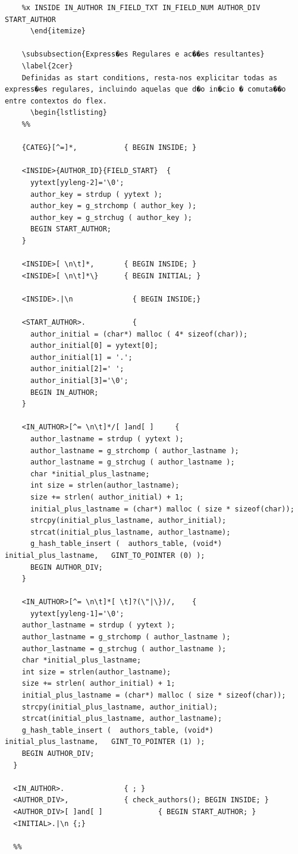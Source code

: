 \documentclass{report}
\begin{document}
      \begin{lstlisting}
    %x INSIDE IN_AUTHOR IN_FIELD_TXT IN_FIELD_NUM AUTHOR_DIV START_AUTHOR
      \end{itemize}

    \subsubsection{Express�es Regulares e ac��es resultantes}
    \label{2cer}
    Definidas as start conditions, resta-nos explicitar todas as express�es regulares, incluindo aquelas que d�o in�cio � comuta��o entre contextos do flex.
      \begin{lstlisting}
    %%

    {CATEG}[^=]*,           { BEGIN INSIDE; }

    <INSIDE>{AUTHOR_ID}{FIELD_START}  {   
      yytext[yyleng-2]='\0';
      author_key = strdup ( yytext );
      author_key = g_strchomp ( author_key );
      author_key = g_strchug ( author_key );
      BEGIN START_AUTHOR;
    }

    <INSIDE>[ \n\t]*,       { BEGIN INSIDE; }
    <INSIDE>[ \n\t]*\}      { BEGIN INITIAL; }

    <INSIDE>.|\n              { BEGIN INSIDE;}

    <START_AUTHOR>.           {
      author_initial = (char*) malloc ( 4* sizeof(char));
      author_initial[0] = yytext[0];
      author_initial[1] = '.';
      author_initial[2]=' ';
      author_initial[3]='\0';
      BEGIN IN_AUTHOR;
    }

    <IN_AUTHOR>[^= \n\t]*/[ ]and[ ]     {   
      author_lastname = strdup ( yytext );
      author_lastname = g_strchomp ( author_lastname );
      author_lastname = g_strchug ( author_lastname );
      char *initial_plus_lastname;
      int size = strlen(author_lastname);
      size += strlen( author_initial) + 1;
      initial_plus_lastname = (char*) malloc ( size * sizeof(char));
      strcpy(initial_plus_lastname, author_initial);
      strcat(initial_plus_lastname, author_lastname);
      g_hash_table_insert (  authors_table, (void*) initial_plus_lastname,   GINT_TO_POINTER (0) );
      BEGIN AUTHOR_DIV;
    }

    <IN_AUTHOR>[^= \n\t]*[ \t]?(\"|\})/,    { 
      yytext[yyleng-1]='\0';
    author_lastname = strdup ( yytext );
    author_lastname = g_strchomp ( author_lastname );
    author_lastname = g_strchug ( author_lastname );
    char *initial_plus_lastname;
    int size = strlen(author_lastname);
    size += strlen( author_initial) + 1;
    initial_plus_lastname = (char*) malloc ( size * sizeof(char));
    strcpy(initial_plus_lastname, author_initial);
    strcat(initial_plus_lastname, author_lastname);
    g_hash_table_insert (  authors_table, (void*) initial_plus_lastname,   GINT_TO_POINTER (1) );
    BEGIN AUTHOR_DIV;
  }

  <IN_AUTHOR>.              { ; }
  <AUTHOR_DIV>,             { check_authors(); BEGIN INSIDE; }
  <AUTHOR_DIV>[ ]and[ ]             { BEGIN START_AUTHOR; }
  <INITIAL>.|\n {;}

  %%
    \end{lstlisting}
\end{document}
